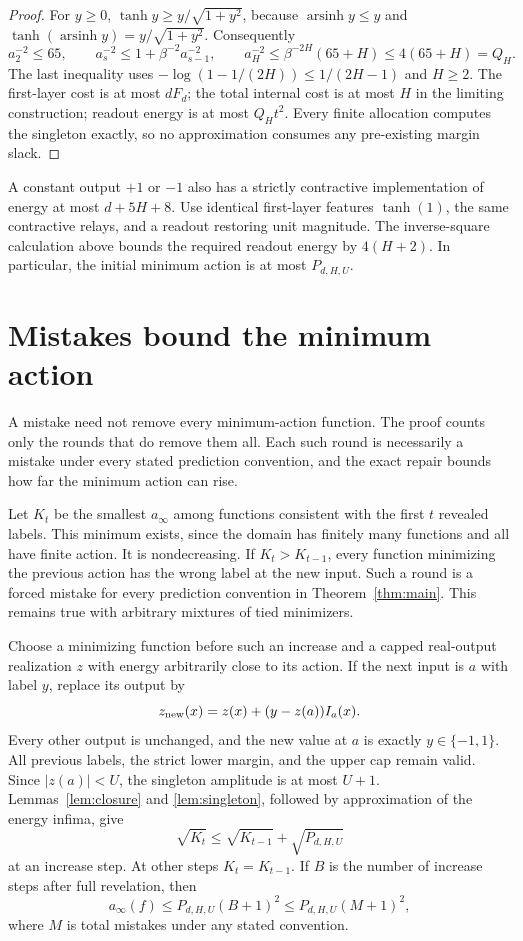 \documentclass[11pt]{article}
\theoremstyle{remark}\newtheorem{remark}[theorem]{Remark}
\begin{document}
\begin{proof}
For $y\ge0$, $\tanh y\ge y/\sqrt{1+y^2}$, because
$\operatorname{arsinh}y\le y$ and
$\tanh(\operatorname{arsinh}y)=y/\sqrt{1+y^2}$.
Consequently
\[
 a_2^{-2}\le65,\qquad
 a_s^{-2}\le1+\beta^{-2}a_{s-1}^{-2},\qquad
 a_H^{-2}\le\beta^{-2H}(65+H)\le4(65+H)=Q_H.
\]
The last inequality uses
$-\log(1-1/(2H))\le1/(2H-1)$ and $H\ge2$.
The first-layer cost is at most $dF_d$; the total internal cost is
at most $H$ in the limiting construction; readout energy is at most
$Q_Ht^2$. Every finite allocation computes the singleton exactly,
so no approximation consumes any pre-existing margin slack.
\end{proof}

A constant output $+1$ or $-1$ also has a strictly contractive
implementation of energy at most $d+5H+8$. Use identical first-layer
features $\tanh(1)$, the same contractive relays, and a readout restoring
unit magnitude. The inverse-square calculation above bounds the required
readout energy by $4(H+2)$. In particular, the initial minimum action is
at most $P_{d,H,U}$.

\section{Mistakes bound the minimum action}
A mistake need not remove every minimum-action function. The proof counts
only the rounds that do remove them all. Each such round is necessarily
a mistake under every stated prediction convention, and the exact repair
bounds how far the minimum action can rise.

Let $K_t$ be the smallest $a_\infty$ among functions consistent with the
first $t$ revealed labels. This minimum exists, since the domain has
finitely many functions and all have finite action. It is nondecreasing.
If $K_t>K_{t-1}$, every function minimizing the previous action has the
wrong label at the new input. Such a round is a forced mistake for every
prediction convention in Theorem~\ref{thm:main}. This remains true with
arbitrary mixtures of tied minimizers.

Choose a minimizing function before such an increase and a capped
real-output realization $z$ with energy arbitrarily close to its action.
If the next input is $a$ with label $y$, replace its output by
\[
 z_{\rm new}(x)=z(x)+(y-z(a))I_a(x).
\]
Every other output is unchanged, and the new value at $a$ is exactly
$y\in\{-1,1\}$. All previous labels, the strict lower margin, and the
upper cap remain valid. Since $|z(a)|<U$, the singleton amplitude is at
most $U+1$. Lemmas~\ref{lem:closure} and \ref{lem:singleton}, followed
by approximation of the energy infima, give
\[
 \sqrt{K_t}\le\sqrt{K_{t-1}}+\sqrt{P_{d,H,U}}
\]
at an increase step. At other steps $K_t=K_{t-1}$. If $B$ is the number
of increase steps after full revelation, then
\begin{equation}\label{eq:energy-mistakes}
 a_\infty(f)\le P_{d,H,U}(B+1)^2
                    \le P_{d,H,U}(M+1)^2,
\end{equation}
where $M$ is total mistakes under any stated convention.
\end{document}
